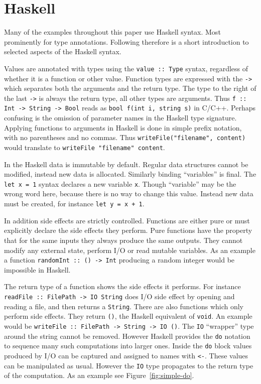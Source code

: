 \section{Haskell}

\label{sec:haskell}

Many of the examples throughout this paper use Haskell syntax. Most prominently
for type annotations. Following therefore is a short introduction to selected
aspects of the Haskell syntax.

Values are annotated with types using the \texttt{value :: Type} syntax,
regardless of whether it is a function or other value. Function types are
expressed with the \texttt{->} which separates both the arguments and the return
type. The type to the right of the last \texttt{->} is always the return type,
all other types are arguments. Thus \texttt{f :: Int -> String -> Bool} reads as
\texttt{bool f(int i, string s)} in C/C++. Perhaps confusing is the omission of
parameter names in the Haskell type signature. Applying functions to arguments
in Haskell is done in simple prefix notation, with no parentheses and no commas.
Thus \texttt{writeFile("filename", content)} would translate to
\texttt{writeFile "filename" content}.

In the Haskell data is immutable by default. Regular data structures cannot be
modified, instead new data is allocated. Similarly binding ``variables'' is
final. The \texttt{let x = 1} syntax declares a new variable \texttt{x}. Though
``variable'' may be the wrong word here, because there is no way to change this
value. Instead new data must be created, for instance \texttt{let y = x + 1}.

In addition side effects are strictly controlled. Functions are either pure or
must explicitly declare the side effects they perform. Pure functions have the
property that for the same inputs they always produce the same outputs. They
cannot modify any external state, perform I/O or read mutable variables. As an
example a function \texttt{randomInt :: () -> Int} producing a random integer
would be impossible in Haskell.

The return type of a function shows the side effects it performs. For instance
\texttt{readFile :: FilePath -> IO String} does I/O side effect by opening and
reading a file, and then returns a \texttt{String}. There are also functions
which only perform side effects. They return \texttt{()}, the Haskell equivalent
of \texttt{void}. An example would be \texttt{writeFile :: FilePath -> String ->
  IO ()}. The \texttt{IO} ``wrapper'' type around the string cannot be removed.
However Haskell provides the \texttt{do} notation to sequence many such
computations into larger ones. Inside the \texttt{do} block values produced by
I/O can be captured and assigned to names with \texttt{<-}. These values can be
manipulated as usual. However the \texttt{IO} type propagates to the return type
of the computation. As an example see Figure~\ref{fig:simple-do}.


